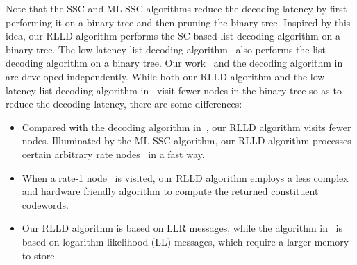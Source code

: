 \documentclass[journal]{IEEEtran}
\begin{document}
Note that the SSC and ML-SSC algorithms reduce the decoding latency by first performing it on a binary tree and then pruning the binary tree. Inspired by this idea, our RLLD algorithm performs the SC based list decoding algorithm on a binary tree. The low-latency list decoding algorithm~\cite{gabi_low_latency} also performs the list decoding algorithm on a binary tree. Our work~\cite{jun_sips} and the decoding algorithm in~\cite{gabi_low_latency} are developed independently. While both our RLLD algorithm and the low-latency list decoding algorithm in~\cite{gabi_low_latency} visit fewer nodes in the binary tree so as to reduce the decoding latency, there are some differences:
\begin{itemize}
\item Compared with the decoding algorithm in~\cite{gabi_low_latency}, our RLLD algorithm visits fewer nodes. Illuminated by the ML-SSC algorithm, our RLLD algorithm processes certain arbitrary rate nodes~\cite{low_latency_polar} in a fast way.
\item When a rate-1 node~\cite{low_latency_polar} is visited, our RLLD algorithm employs a less complex and hardware friendly algorithm to compute the returned constituent codewords.
\item Our RLLD algorithm is based on LLR messages, while the algorithm in~\cite{gabi_low_latency} is based on logarithm likelihood (LL) messages, which require a larger memory to store.
\end{itemize}
\end{document}
